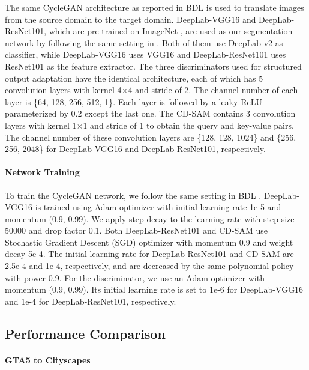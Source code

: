 \documentclass[10pt,twocolumn,letterpaper]{article}
\begin{document}
	The same CycleGAN architecture \cite{zhu2017unpaired} as reported in BDL \cite{li2019bidirectional} is used to translate images from the source domain to the target domain. DeepLab-VGG16 and DeepLab-ResNet101, which are pre-trained on ImageNet \cite{deng2009imagenet}, are used as our segmentation network by following the same setting in \cite{tsai2018learning}. Both of them use DeepLab-v2 \cite{chen2018deeplab} as classifier, while DeepLab-VGG16 uses VGG16 \cite{simonyan2014very} and DeepLab-ResNet101 uses ResNet101 \cite{he2016deep} as the feature extractor. The three discriminators used for structured output adaptation have the identical architecture, each of which has 5 convolution layers with kernel 4$ \times $4 and stride of 2. The channel number of each layer is \{64, 128, 256, 512, 1\}. Each layer is followed by a leaky ReLU \cite{maas2013rectifier} parameterized by 0.2 except the last one. The CD-SAM contains 3 convolution layers with kernel 1$ \times $1 and stride of 1 to obtain the query and key-value pairs. The channel number of these convolution layers are \{128, 128, 1024\} and \{256, 256, 2048\} for DeepLab-VGG16 and DeepLab-ResNet101, respectively.


	\paragraph{Network Training}

	To train the CycleGAN network, we follow the same setting in BDL \cite{li2019bidirectional}. DeepLab-VGG16 is trained using Adam optimizer with initial learning rate 1e-5 and momentum (0.9, 0.99). We apply step decay to the learning rate with step size 50000 and drop factor 0.1. Both DeepLab-ResNet101 and CD-SAM use Stochastic Gradient Descent (SGD) optimizer with momentum 0.9 and weight decay 5e-4. The initial learning rate for DeepLab-ResNet101 and CD-SAM are 2.5e-4 and 1e-4, respectively, and are decreased by the same polynomial policy with power 0.9. For the discriminator, we use an Adam optimizer with momentum (0.9, 0.99). Its initial learning rate is set to 1e-6 for DeepLab-VGG16 and 1e-4 for DeepLab-ResNet101, respectively.






	\subsection{Performance Comparison}
	\paragraph{GTA5 to Cityscapes}
\end{document}
